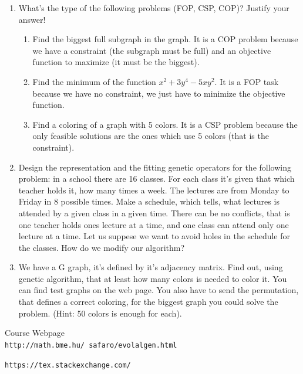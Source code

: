 \documentclass[12pt,english]{article}
\newenvironment{statement}{\fontfamily{ptm}\selectfont}{\par}
\begin{document}
\begin{enumerate}

	\item
		\begin{statement}
		What’s the type of the following problems (FOP, CSP, COP)? Justify your answer!
		\end{statement}
			\begin{enumerate}
				\item Find the biggest full subgraph in the graph. It is a COP problem because we have a constraint (the subgraph must be full) and an objective function to maximize (it must be the biggest).
				\item Find the minimum of the function $x^2 +3y^4 - 5xy^2$. It is a FOP task because we have no constraint, we just have to minimize the objective function.
				\item Find a coloring of a graph with 5 colors. It is a CSP problem because the only feasible solutions are the ones which use 5 colors (that is the constraint).
			\end{enumerate}

	\item
		\begin{statement}
		Design the representation and the fitting genetic operators for the following problem: in a school there are 16 classes. For each class it’s given that which teacher holds it, how many times a week. The lectures are from Monday to Friday in 8 possible times. Make a schedule, which tells, what lectures is attended by a given class in a given time. There can be no conflicts, that is one teacher holds ones lecture at a time, and one class can attend only one lecture at a time. Let us suppese we want to avoid holes in the schedule for the classes. How do we modify our algorithm?
		\end{statement}


	\item
		\begin{statement}
		We have a G graph, it’s defined by it’s adjacency matrix. Find out, using genetic algorithm, that at least how many colors is needed to color it. You can find test graphs on the web page. You also have to send the permutation, that defines a correct coloring, for the biggest graph you could solve the problem. (Hint: 50 colors is enough for each).
		\end{statement}


\end{enumerate}


\begin{thebibliography}{9}

Course Webpage
\\\texttt{http://math.bme.hu/~safaro/evolalgen.html}


\texttt{https://tex.stackexchange.com/}


\end{thebibliography}
\end{document}
